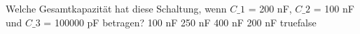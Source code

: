     {Welche Gesamtkapazität hat diese Schaltung, wenn $C\_1$ = 200 nF, $C\_2$ = 100 nF und $C\_3$ = 100000 pF betragen?}
    {100 nF}
    {250 nF}
    {400 nF}
    {200 nF}
    {true}{false}